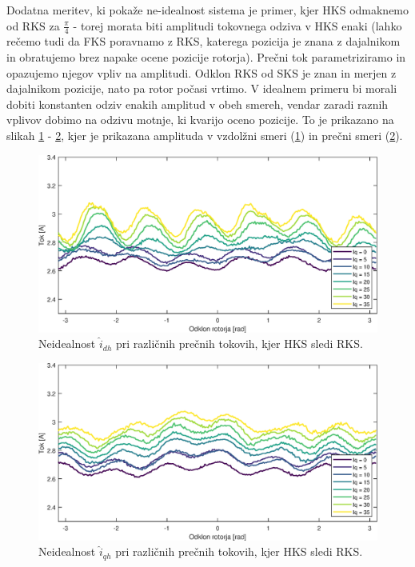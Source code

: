 \documentclass[a4paper,twoside,openright,12pt,slovene]{book}
\begin{document}
Dodatna meritev, ki pokaže ne-idealnost sistema je primer, kjer HKS odmaknemo od RKS za $\frac{\pi}{4}$ - torej morata biti amplitudi tokovnega odziva v HKS enaki (lahko rečemo tudi da FKS poravnamo z
RKS, katerega pozicija je znana z dajalnikom in obratujemo brez napake ocene pozicije rotorja). Prečni tok parametriziramo in opazujemo njegov vpliv na amplitudi. Odklon RKS od SKS je znan in merjen z
dajalnikom pozicije, nato pa rotor počasi vrtimo.  V idealnem primeru bi morali dobiti konstanten odziv enakih amplitud v obeh smereh, vendar zaradi raznih vplivov dobimo na odzivu motnje, ki kvarijo
oceno pozicije. To je prikazano na slikah \ref{tokovniOdzivIs_HKSslediRKS_IdAmp} - \ref{tokovniOdzivIs_HKSslediRKS_IqAmp}, kjer je prikazana amplituda v vzdolžni smeri
(\ref{tokovniOdzivIs_HKSslediRKS_IdAmp}) in prečni smeri (\ref{tokovniOdzivIs_HKSslediRKS_IqAmp}).
\newpage

\begin{figure}[!htbp]
    \centering
    \includegraphics[width=0.95\columnwidth]{Slike/tokovniOdzivIs_HKSslediRKS_IdAmp.eps}
    \caption{\label{tokovniOdzivIs_HKSslediRKS_IdAmp} Neidealnost $\hat{i}_{dh}$ pri različnih prečnih tokovih, kjer HKS sledi RKS.}
\end{figure}

\begin{figure}[!htbp]
    \centering
    \includegraphics[width=0.95\columnwidth]{Slike/tokovniOdzivIs_HKSslediRKS_IqAmp.eps}
    \caption{\label{tokovniOdzivIs_HKSslediRKS_IqAmp} Neidealnost $\hat{i}_{qh}$ pri različnih prečnih tokovih, kjer HKS sledi RKS.}
\end{figure}
\end{document}
